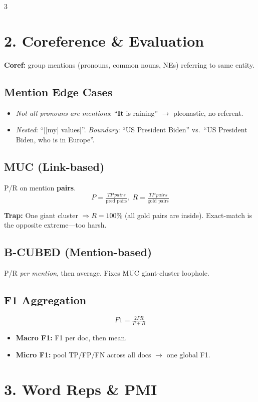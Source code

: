 \documentclass[8pt,a4paper,landscape]{extarticle}
\newcommand{\trap}[1]{{\small\colorbox{yellow!30}{\parbox{0.93\linewidth}{\textbf{\textcolor{red!70!black}{Trap:}} #1}}}}
\begin{document}
\begin{multicols*}{3}
    \section*{2. Coreference \& Evaluation}
    \textbf{Coref:} group mentions (pronouns, common nouns, NEs) referring to same entity.

    \subsection*{Mention Edge Cases}
    \begin{itemize}
        \item \emph{Not all pronouns are mentions}: ``\textbf{It} is raining'' $\to$ pleonastic, no referent.
        \item \emph{Nested}: ``[[my] values]''. \emph{Boundary}: ``US President Biden'' vs.~``US President Biden, who is in Europe''.
    \end{itemize}

    \subsection*{MUC (Link-based)}
    P/R on mention \textbf{pairs}.
    \[P=\tfrac{TP\ pairs}{\text{pred pairs}},\ R=\tfrac{TP\ pairs}{\text{gold pairs}}\]
    \trap{One giant cluster $\Rightarrow R=100\%$ (all gold pairs are inside). Exact-match is the opposite extreme---too harsh.}

    \subsection*{B-CUBED (Mention-based)}
    P/R \emph{per mention}, then average. Fixes MUC giant-cluster loophole.

    \subsection*{F1 Aggregation}
    \[F1=\tfrac{2PR}{P+R}\]
    \begin{itemize}
        \item \textbf{Macro F1:} F1 per doc, then mean.
        \item \textbf{Micro F1:} pool TP/FP/FN across all docs $\to$ one global F1.
    \end{itemize}

    \section*{3. Word Reps \& PMI}


\end{multicols*}
\end{document}
